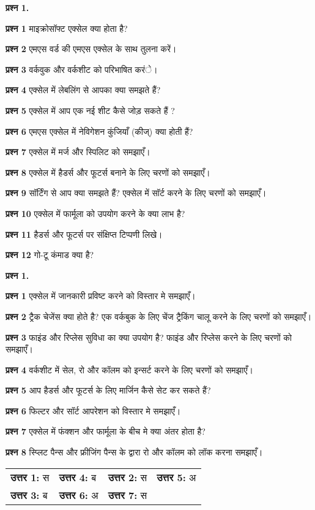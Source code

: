 \begin{descriptionSimple}{\textbf{प्रश्न 1.}}
\item[\textbf{प्रश्न 1}] माइक्रोसॉफ्ट एक्सेल क्या होता है?
\item[\textbf{प्रश्न 2}] एमएस वर्ड की एमएस एक्सेल के साथ तुलना करें।
\item[\textbf{प्रश्न 3}] वर्कवुक और वर्कशीट को परिभाषित करंे।
\item[\textbf{प्रश्न 4}] एक्सेल में लेबलिंग से आपका क्या समझते हैं?
\item[\textbf{प्रश्न 5}] एक्सेल में आप एक नई शीट कैसे जोड़ सकते हैं ?
\item[\textbf{प्रश्न 6}] एमएस एक्सेल में नेविगेशन कुंजियाँ (कीज्) क्या होती हैं?
\item[\textbf{प्रश्न 7}] एक्सेल में मर्ज और स्पिलिट को समझाएँ।
\item[\textbf{प्रश्न 8}] एक्सेल में हैडर्स और फूटर्स बनाने के लिए चरणों को समझाएँ।
\item[\textbf{प्रश्न 9}] सॉर्टिंग से आप क्या समझते हैं? एक्सेल में सॉर्ट करने के लिए चरणों को समझाएँ।
\item[\textbf{प्रश्न 10}] एक्सेल में फार्मूला को उपयोग करने के क्या लाभ है?
\item[\textbf{प्रश्न 11}] हैडर्स और फूटर्स पर संक्षिप्त टिप्पणी लिखे।
\item[\textbf{प्रश्न 12}] गो-टू कंमाड क्या है?					
\end{descriptionSimple}					
\newpage

\begin{descriptionSimple}{\textbf{प्रश्न 1.}}
\item[\textbf{प्रश्न 1}] एक्सेल में जानकारी प्रविष्ट करने को विस्तार मे समझाएँ।
\item[\textbf{प्रश्न 2}] ट्रैक चेजेंस क्या होते है? एक वर्कबुक के लिए चेंज ट्रैकिंग चालू करने के लिए चरणों को समझाएँ।
\item[\textbf{प्रश्न 3}] फाइंड और रिप्लेस सुविधा का क्या उपयोग है? फाइंड और रिप्लेस करने के लिए चरणों को समझाएँ।
\item[\textbf{प्रश्न 4}] वर्कशीट में सेल, रो और कॉलम को इन्सर्ट करने के लिए चरणों को समझाएँ।
\item[\textbf{प्रश्न 5}] आप हैडर्स और फूटर्स के लिए मार्जिन कैसे सेट कर सकते हैं?
\item[\textbf{प्रश्न 6}] फिल्टर और सॉर्ट आपरेशन को विस्तार मे समझाएँ।
\item[\textbf{प्रश्न 7}] एक्सेल में फंक्शन और फार्मूला के बीच मे क्या अंतर होता है?
\item[\textbf{प्रश्न 8}] स्प्लिट पैन्स और फ्रीजिंग पैन्स के द्वारा रो और कॉलम को लॉक करना समझाएँ।
\end{descriptionSimple}


\begin{tabular}{@{}llll}
\textbf{उत्तर 1:} स & 
\textbf{उत्तर 4:} ब &
\textbf{उत्तर 2:} स &
\textbf{उत्तर 5:} अ\\
\textbf{उत्तर 3:} ब &
\textbf{उत्तर 6:} अ &
\textbf{उत्तर 7:} स	&		
\end{tabular}
